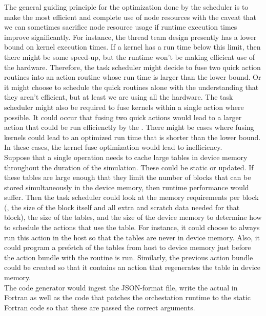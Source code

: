 \documentclass{article}
\begin{document}
The general guiding principle for the optimization done by the scheduler is to
make the most efficient and complete use of node resources with the caveat that
we can sometimes sacrifice node resource usage if runtime execution times improve
significantly.  For instance, the thread team design presently has a lower bound
on kernel execution times.  If a kernel has a run time
below this limit, then there might be some speed-up, but the runtime won't be
making efficient use of the hardware.  Therefore, the task scheduler might
decide to fuse two quick action routines into an action routine whose run time is larger
than the lower bound.  Or it might choose to schedule the quick routines alone
with the understanding that they aren't efficient, but at least we are using all
the hardware.  The task scheduler might also be required to fuse
kernels within a single action where possible.  It could occur that fusing two
quick actions would lead to a larger action that could be run efficienctly by
the \OR.  There might be cases where fusing kernels could lead to an
optimized run time that is shorter than the lower bound.  In these cases, the
kernel fuse optimization would lead to inefficiency.\\

Suppose that a single operation needs to cache large tables in device
memory throughout the duration of the simulation.  These could be static or
updated.  If these tables are large enough that they limit the number of blocks that can be
stored simultaneously in the device memory, then runtime performance would
suffer.  Then the task scheduler could look at the memory requirements
per block (\ie, the size of the block itself and all extra and scratch data
needed for that block), the size of the tables, and the size of the device
memory to determine how to schedule the actions that use the table.  For
instance, it could choose to always run this action in the host so that the
tables are never in device memory.  Also, it could program a prefetch of the
tables from host to device memory just before the action bundle with the routine
is run.  Similarly, the previous action bundle could be created so that it
contains an action that regenerates the table in device memory.\\

The code generator would ingest the JSON-format file, write the actual
 in Fortran as well as the code that patches the
orchestation runtime to the static Fortran code so that these are passed the
correct arguments.\\
\end{document}
